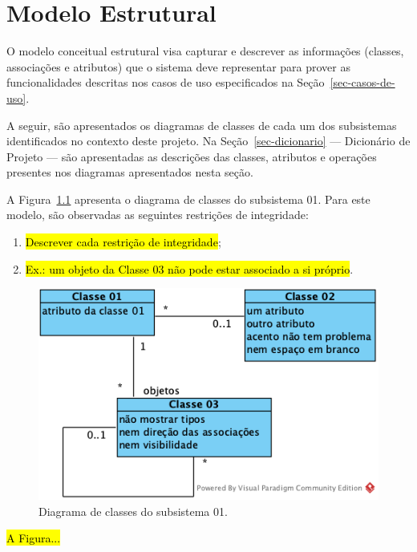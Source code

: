 \chapter{Modelo Estrutural}
\label{sec-modelo-estrutural}
\vspace{-1cm}

O modelo conceitual estrutural visa capturar e descrever as informações (classes, associações e atributos) que o sistema deve representar para prover as funcionalidades descritas nos casos de uso especificados na Seção~\ref{sec-casos-de-uso}. 

A seguir, são apresentados os diagramas de classes de cada um dos subsistemas identificados no contexto deste projeto. Na Seção~\ref{sec-dicionario} --- Dicionário de Projeto --- são apresentadas as descrições das classes, atributos e operações presentes nos diagramas apresentados nesta seção.


A Figura~\ref{fig-modelo-estrutural-subsistema-primeiro} apresenta o diagrama de classes do subsistema 01. Para este modelo, são observadas as seguintes restrições de integridade:

\begin{enumerate}
	\item \hl{Descrever cada restrição de integridade};
	\item \hl{Ex.: um objeto da \textsf{Classe 03} não pode estar associado a si próprio}.
\end{enumerate}

\begin{figure}[h]
	\centering
	\includegraphics[width=.7\textwidth]{figuras/fig-modelo-estrutural-subsistema-primeiro.png}
	\caption{Diagrama de classes do subsistema 01.}
	\label{fig-modelo-estrutural-subsistema-primeiro}
\end{figure} 


\hl{A Figura...}

\FloatBarrier
